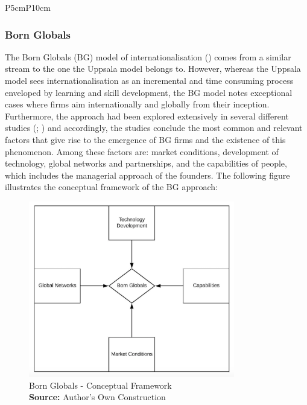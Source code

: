 \documentclass[11pt,a4paper]{article}
\newcommand*{\captionsource}[2]{%
  \caption[{#1}]{%
    #1%
    \\\hspace{\linewidth}%
    \textbf{Source:} #2%
  }%
}
\begin{document}
{\begin{table}[H]
\begin{tabular}{P{5cm}P{10cm}}
\bottomrule
\end{tabular}
\vspace{5mm}
\captionsetup{width=0.7\linewidth}
\caption{The Uppsala Model of Internationalisation: Consolidated Representation of Factors (Author's Compilation)} 
\label{table:uppsala_factors}
\end{table} 

  \vspace{5mm}
\subsubsection{Born Globals}
\label{born_global_th}
The Born Globals (BG) model of internationalisation (\cite{rennieGlobalCompetitivenessBorn1993}) comes from a similar stream to the one the Uppsala model belongs to. However, whereas the Uppsala model sees internationalisation as an incremental and time consuming process enveloped by learning and skill development, the BG model notes exceptional cases where firms aim internationally and globally from their inception. Furthermore, the approach had been explored extensively in several different studies (\cite{madsenInternationalizationBornGlobals1997}; \cite{knightBornGlobalFirm1996}) and accordingly, the studies conclude the most common and relevant factors that give rise to the emergence of BG firms and the existence of this phenomenon. Among these factors are: market conditions, development of technology, global networks and partnerships, and the capabilities of people, which includes the managerial approach of the founders. The following figure illustrates the conceptual framework of the BG approach:\par
\newpage

  \vspace{5mm}
\begin{figure}[H]
	\centering
  \includegraphics[width=90mm]{figures/fig_born_global_frm}
  \vspace{5mm}
    \captionsetup{justification=centering,margin=2cm}
      \captionsource{Born Globals - Conceptual Framework}{Author's Own Construction}
	\label{fig:born_globals_frame}
\end{figure}


}
\end{document}
